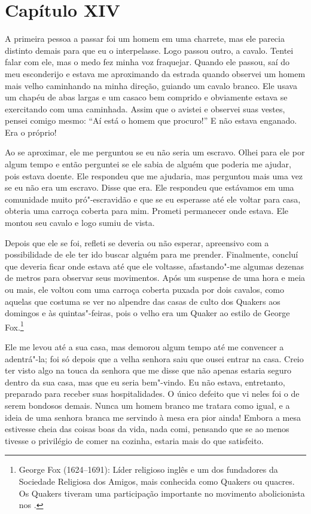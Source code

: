\chapter*{Capítulo XIV}

A primeira pessoa a passar foi um homem em uma charrete, mas ele parecia
distinto demais para que eu o interpelasse. Logo passou outro, a cavalo.
Tentei falar com ele, mas o medo fez minha voz fraquejar. Quando ele
passou, saí do meu esconderijo e estava me aproximando da estrada quando
observei um homem mais velho caminhando na minha direção, guiando um
cavalo branco. Ele usava um chapéu de abas largas e um casaco bem
comprido e obviamente estava se exercitando com uma caminhada. Assim que
o avistei e observei suas vestes, pensei comigo mesmo: ``Aí está o homem
que procuro!'' E não estava enganado. Era o próprio!

Ao se aproximar, ele me perguntou se eu não seria um escravo. Olhei para
ele por algum tempo e então perguntei se ele sabia de alguém que poderia
me ajudar, pois estava doente. Ele respondeu que me ajudaria, mas
perguntou mais uma vez se eu não era um escravo. Disse que era. Ele
respondeu que estávamos em uma comunidade muito pró"-escravidão e que se
eu esperasse até ele voltar para casa, obteria uma carroça coberta para
mim. Prometi permanecer onde estava. Ele montou seu cavalo e logo sumiu
de vista.

Depois que ele se foi, refleti se deveria ou não esperar, apreensivo com
a possibilidade de ele ter ido buscar alguém para me prender.
Finalmente, concluí que deveria ficar onde estava até que ele voltasse,
afastando"-me algumas dezenas de metros para observar seus movimentos.
Após um suspense de uma hora e meia ou mais, ele voltou com uma carroça
coberta puxada por dois cavalos, como aquelas que costuma se ver no
alpendre das casas de culto dos Quakers aos domingos e às
quintas"-feiras, pois o velho era um Quaker ao estilo de George
Fox.\footnote{George Fox (1624--1691): Líder religioso inglês e um dos
  fundadores da Sociedade Religiosa dos Amigos, mais conhecida como
  Quakers ou quacres. Os Quakers tiveram uma participação importante no
  movimento abolicionista nos .}

Ele me levou até a sua casa, mas demorou algum tempo até me convencer a
adentrá"-la; foi só depois que a velha senhora saiu que ousei entrar na
casa. Creio ter visto algo na touca da senhora que me disse que não
apenas estaria seguro dentro da sua casa, mas que eu seria bem"-vindo. Eu
não estava, entretanto, preparado para receber suas hospitalidades. O
único defeito que vi neles foi o de serem bondosos demais. Nunca um
homem branco me tratara como igual, e a ideia de uma senhora branca me
servindo à mesa era pior ainda! Embora a mesa estivesse cheia das coisas
boas da vida, nada comi, pensando que se ao menos tivesse o privilégio
de comer na cozinha, estaria mais do que satisfeito.

